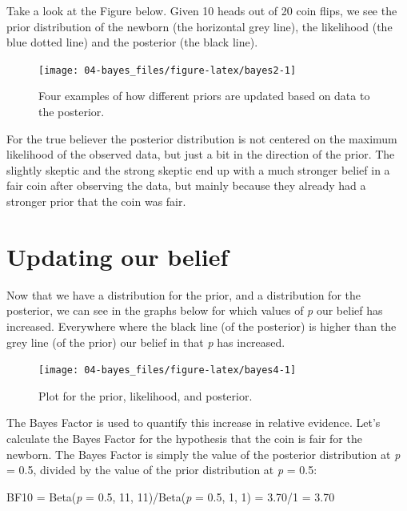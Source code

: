 \documentclass[
  oneside]{book}
\begin{document}
Take a look at the Figure below. Given 10 heads out of 20 coin flips, we see the prior distribution of the newborn (the horizontal grey line), the likelihood (the blue dotted line) and the posterior (the black line).

\begin{figure}

{\centering \texttt{[image: 04-bayes\_files/figure-latex/bayes2-1]} 

}

\caption{Four examples of how different priors are updated based on data to the posterior.}\label{fig:bayes2}
\end{figure}

For the true believer the posterior distribution is not centered on the maximum likelihood of the observed data, but just a bit in the direction of the prior. The slightly skeptic and the strong skeptic end up with a much stronger belief in a fair coin after observing the data, but mainly because they already had a stronger prior that the coin was fair.

\hypertarget{updating-our-belief}{%
\section{Updating our belief}\label{updating-our-belief}}

Now that we have a distribution for the prior, and a distribution for the posterior, we can see in the graphs below for which values of \emph{p} our belief has increased. Everywhere where the black line (of the posterior) is higher than the grey line (of the prior) our belief in that \emph{p} has increased.

\begin{figure}

{\centering \texttt{[image: 04-bayes\_files/figure-latex/bayes4-1]} 

}

\caption{Plot for the prior, likelihood, and posterior.}\label{fig:bayes4}
\end{figure}

The Bayes Factor is used to quantify this increase in relative evidence. Let's calculate the Bayes Factor for the hypothesis that the coin is fair for the newborn. The Bayes Factor is simply the value of the posterior distribution at \emph{p} = 0.5, divided by the value of the prior distribution at \emph{p} = 0.5:

BF10 = Beta(\emph{p} = 0.5, 11, 11)/Beta(\emph{p} = 0.5, 1, 1) = 3.70/1 = 3.70
\end{document}
